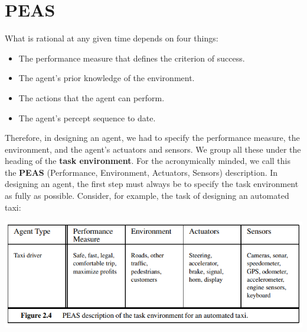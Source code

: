\section{PEAS}
What is rational at any given time depends on four things:
\begin{itemize}
    \item The performance measure that defines the criterion of success.
    \item The agent’s prior knowledge of the environment.

    \item The actions that the agent can perform.

    \item The agent’s percept sequence to date.
\end{itemize}
Therefore, in designing an agent, we had to specify the performance measure, the environment, and the agent’s actuators and sensors. We group all these under the heading of the \textbf{task environment}. For the acronymically minded, we call this the \textbf{PEAS} (Performance, Environment, Actuators, Sensors) description. In designing an agent, the first step must always be to specify the task environment as fully as possible.\newline\newline
Consider, for example, the task of designing an automated taxi:
\begin{center}
    \includegraphics[]{images/Autonomous driving.png}
\end{center}

